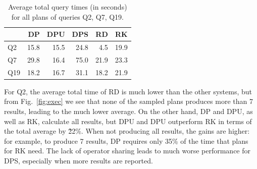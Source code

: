



\begin{table}[htb]
  \centering
  \begin{tabular}{l|r|r|r|r|r}
        & DP   & DPU  & DPS  & RD   & RK   \\
    \hline
    Q2  & 15.8 & 15.5 & 24.8 & 4.5  & 19.9 \\
    Q7  & 29.8 & 16.4 & 75.0 & 21.9 & 23.3 \\
    Q19 & 18.2 & 16.7 & 31.1 & 18.2 & 21.9 \\
  \end{tabular}
  \caption{Average total query times (in seconds) for all plans of queries Q2, Q7, Q19.}
  \label{tab:exectimes}
\end{table}

For Q2, the average total time of RD is much lower than the other
systems, but from Fig.~\ref{fig:exec} we see that none of the sampled
plans produces more than 7 results, leading to the much lower
average. On the other hand, DP and DPU, as well as RK, calculate all
results, but DPU and DPU outperform RK in terms of the total average
by \~22\%. When not producing all results, the gains are higher: for
example, to produce 7 results, DP requires only 35\% of the time that
plans for RK need. The lack of operator sharing leads to much worse
performance for DPS, especially when more results are reported.

